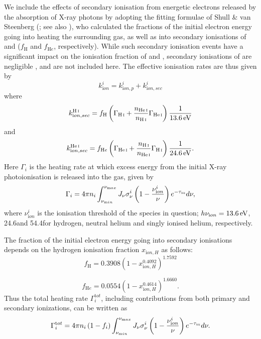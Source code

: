 \documentclass[../thesis.tex]{subfiles}
\begin{document}
We include the effects of secondary ionisation from energetic electrons released by the absorption of X-ray photons by adopting the fitting formulae of Shull \& van Steenberg (\citeyear{ShullvanSteenberg1985}; see also \citealt{ValdesFerrara2008, FurlanettoStoever2010}), who calculated the fractions of the initial electron energy going into heating the surrounding gas, as well as into secondary ionisations of \HI and \HeI ($f_{\mathrm H}$ and $f_{\mathrm He}$, respectively). While such secondary ionisation events have a significant impact on the ionisation fraction of \HI and \HeI, secondary ionisations of \HeII are negligible \citep{ShullvanSteenberg1985}, and are not included here.  The effective ionisation rates are thus given by
\begin{equation}
k^i_{\mathrm ion} = k^i_{\mathrm ion, p} + k^i_{\mathrm ion, sec}
\end{equation}
where
\begin{equation}
k^{\mathrm {\mathrm{H\,\textsc{i}}}}_{\mathrm ion, sec} = f_{\mathrm H} \left( \Gamma_{\mathrm {\mathrm{H\,\textsc{i}}}} + \frac{n_{\mathrm {\mathrm{He\,\textsc{i}}}}}{ n_{\mathrm {\mathrm{H\,\textsc{i}}}}} \Gamma_{\mathrm {\mathrm{He\,\textsc{i}}}} \right) \frac{1}{13.6\,\mathrm{eV}}
\end{equation}
and
\begin{equation}
k^{\mathrm {\mathrm{He\,\textsc{i}}}}_{\mathrm ion, sec} = f_{\mathrm He} \left( \Gamma_{\mathrm {\mathrm{He\,\textsc{i}}}} + \frac{n_{\mathrm {\mathrm{H\,\textsc{i}}}}}{ n_{\mathrm {\mathrm{He\,\textsc{i}}}}} \Gamma_{\mathrm {\mathrm{H\,\textsc{i}}}} \right) \frac{1}{24.6\,\mathrm{eV}}.
\end{equation}
Here $\Gamma_i$ is the heating rate at which excess energy from the initial X-ray photoionisation is released into the gas, given by
\begin{equation}
\Gamma_i = 4\pi n_i \int_{\nu_{\mathrm min}}^{\nu_{\mathrm max}} J_{\nu} \sigma^i_{\nu}
\left(1 - \frac{\nu^i_{\mathrm ion}}{\nu} \right) e^{-\tau_{\textsc{xr}}} d\nu,
\end{equation} 
where $\nu^i_{\mathrm ion}$ is the ionisation threshold of the species in question; $h\nu_{\mathrm ion} = 13.6\,\mathrm{eV}$, 24.6\ev and 54.4\ev for hydrogen, neutral helium and singly ionised helium, respectively.

The fraction of the initial electron energy going into secondary ionisations depends on the hydrogen ionisation fraction $x_{\mathrm ion, H}$ as follows:
\begin{equation}
f_{\mathrm H} = 0.3908 \left( 1 - x_{\mathrm ion, H}^{0.4092} \right) ^{1.7592}
\end{equation}

\begin{equation}
f_{\mathrm He} = 0.0554 \left( 1 - x_{\mathrm ion, H}^{0.4614} \right) ^{1.6660}.
\end{equation}
Thus the total heating rate $\Gamma_i^{\mathrm tot}$, including contributions from both primary and secondary ionizations, can be written as
\begin{equation}
\Gamma_i^{\mathrm tot} = 4\pi n_i \left(1 - f_i \right)
\int_{\nu_{\mathrm min}}^{\nu_{\mathrm max}} J_{\nu} \sigma^i_{\nu}
\left(1 - \frac{\nu^i_{\mathrm ion}}{\nu} \right) e^{-\tau_{\textsc{xr}}} d\nu.
\end{equation}
\end{document}
